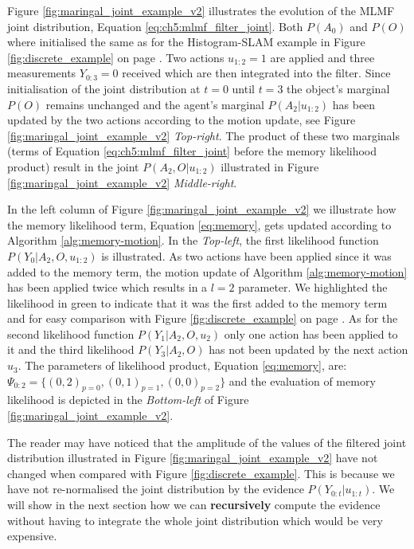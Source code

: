 Figure \ref{fig:maringal_joint_example_v2} illustrates the evolution of the MLMF joint distribution, Equation  \ref{eq:ch5:mlmf_filter_joint}.
Both $P(A_0)$ and $P(O)$ where initialised the same as for the Histogram-SLAM example in Figure \ref{fig:discrete_example} on page \pageref{fig:discrete_example}.
Two actions $u_{1:2}=1$ are applied and three measurements $Y_{0:3} = 0$ received which are then integrated into the filter. 
Since initialisation of the joint distribution at $t=0$ until $t=3$ the object's marginal $P(O)$ remains unchanged and the agent's 
marginal $P(A_2|u_{1:2})$ has been updated by the two actions according to the motion update, see Figure \ref{fig:maringal_joint_example_v2} \textit{Top-right}.
The product of these two marginals (terms of Equation \ref{eq:ch5:mlmf_filter_joint} before the memory likelihood product) result in the joint $P(A_2,O|u_{1:2})$
illustrated in Figure \ref{fig:maringal_joint_example_v2} \textit{Middle-right}.

In the left column of Figure \ref{fig:maringal_joint_example_v2} we illustrate how the memory likelihood term, Equation \ref{eq:memory}, 
gets updated according to Algorithm \ref{alg:memory-motion}. In the \textit{Top-left}, the first likelihood function $P(Y_0|A_2,O,u_{1:2})$ 
is illustrated. As two actions have been applied since it was added to the memory term, the motion update of Algorithm \ref{alg:memory-motion} 
has been applied twice which results in a $l=2$ parameter. We highlighted the likelihood in green to indicate that it was the first added to the 
memory term and for easy comparison with Figure \ref{fig:discrete_example} on page \pageref{fig:discrete_example}. As for the second 
likelihood function $P(Y_1|A_2,O,u_{2})$ only one action has been applied to it and the third likelihood $P(Y_3|A_2,O)$ has not been updated by 
the next action $u_3$. The parameters of likelihood product, Equation \ref{eq:memory}, are: $\Psi_{0:2} = \{(0,2)_{p=0},(0,1)_{p=1},(0,0)_{p=2}\}$ and the evaluation of memory 
likelihood is depicted in the \textit{Bottom-left} of Figure \ref{fig:maringal_joint_example_v2}. 

The reader may have noticed that the amplitude of the values of the filtered joint distribution illustrated in Figure \ref{fig:maringal_joint_example_v2} have not changed
when compared with Figure \ref{fig:discrete_example}. This is because we have not re-normalised the joint distribution by the evidence $P(Y_{0:t}|u_{1:t})$. We will show 
in the next section how we can \textbf{recursively} compute the evidence without having to integrate the whole joint distribution which would be very expensive.



